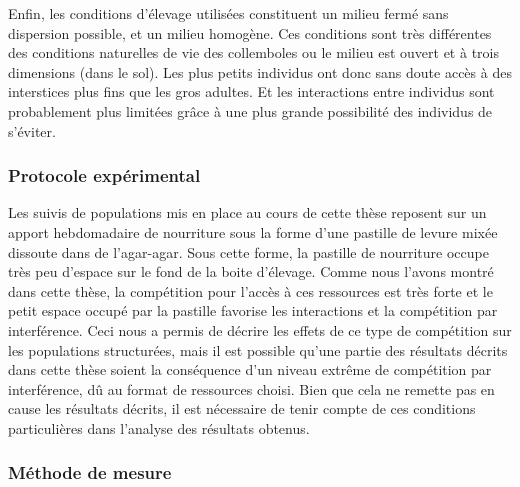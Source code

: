 Enfin, les conditions d'élevage utilisées constituent un milieu fermé sans
dispersion possible, et un milieu homogène. Ces conditions sont très différentes
des conditions naturelles de vie des collemboles ou le milieu est ouvert et à
trois dimensions (dans le sol). Les plus petits individus ont donc sans doute
accès à des interstices plus fins que les gros adultes. Et les interactions
entre individus sont probablement plus limitées grâce à une plus grande
possibilité des individus de s'éviter.

\subsubsection{Protocole expérimental}

Les suivis de populations mis en place au cours de cette thèse reposent sur un
apport hebdomadaire de nourriture sous la forme d'une pastille de levure mixée
dissoute dans de l'agar-agar. Sous cette forme, la pastille de nourriture occupe
très peu d'espace sur le fond de la boite d'élevage. Comme nous l'avons montré
dans cette thèse, la compétition pour l'accès à ces ressources est très forte et
le petit espace occupé par la pastille favorise les interactions et la
compétition par interférence. Ceci nous a permis de décrire les effets de ce
type de compétition sur les populations structurées, mais il est possible qu'une
partie des résultats décrits dans cette thèse soient la conséquence d'un niveau
extrême de compétition par interférence, dû au format de ressources choisi. Bien
que cela ne remette pas en cause les résultats décrits, il est nécessaire de
tenir compte de ces conditions particulières dans l'analyse des résultats
obtenus.

\subsubsection{Méthode de mesure}

